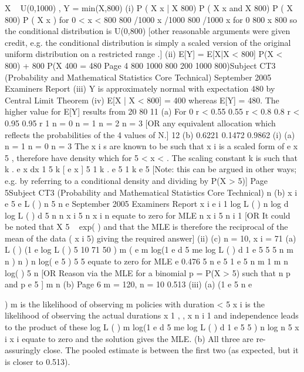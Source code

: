 \documentclass[a4paper,12pt]{article}
\begin{document}
X ~ U(0,1000) , Y = min(X,800)
(i)
P ( X
x | X
800)
P ( X
x and X 800)
P ( X 800)
P ( X x )
for 0 < x < 800
800 /1000
x /1000
800 /1000
x
for 0
800
x 800
so the conditional distribution is U(0,800)
[other reasonable arguments were given credit, e.g. the conditional
distribution is simply a scaled version of the original uniform distribution on a
restricted range .]
(ii)
E[Y] = E[X|X < 800] P(X < 800) + 800 P(X
400
= 480
Page 4
800
1000
800
200
1000
800)Subject CT3 (Probability and Mathematical Statistics Core Technical)
September 2005
Examiners Report
(iii) Y is approximately normal with expectation 480 by Central Limit Theorem
(iv) E[X | X < 800] = 400 whereas E[Y] = 480.
The higher value for E[Y] results from 20%
80%
11
(a)
For 0 r < 0.55
0.55 r < 0.8
0.8 r < 0.95
0.95 r 1
n = 0
n = 1
n = 2
n = 3
[OR any equivalent allocation which reflects the probabilities of the 4 values
of N.]
12
(b) 0.6221
0.1472
0.9862
(i) (a)
n = 1
n = 0
n = 3
The x i s are known to be such that x i
is a scaled form of e
x
5 , therefore have density which
for 5 < x < .
The scaling constant k is such that
k . e
x
dx 1
5
k [ e
x
] 5
1
k . e
5
1
k
e 5
[Note: this can be argued in other ways; e.g. by referring to a
conditional density and dividing by P(X > 5)]
Page 5Subject CT3 (Probability and Mathematical Statistics Core Technical)
n
(b)
x i
e 5 e
L ( )
n 5 n
e
September 2005
Examiners Report
x i
e
i 1
log L ( )
n log
d
log L ( )
d
5 n
n
x i
5 n
x i
n
equate to zero for MLE
n
x i 5 n
i 1
[OR It could be noted that X 5 ~ exp( ) and that the MLE is
therefore the reciprocal of the mean of the data ( x i 5) giving the
required answer]
(ii)
(c) n = 10, x i = 71
(a) L ( ) (1 e
log L ( )
5
10
71 50
) m ( e
m log(1 e
d
5 me
log L ( )
d
1 e
5
5
5
n
m n
) n
) n log( e
5
)
5
5
equate to zero for MLE
e
0.476
5 n
e
5
1 e
5
n
m
1
m n
log(
)
5
n
[OR Reason via the MLE for a binomial p = P(X > 5) such that
n
p
and p e 5 ]
m n
(b)
Page 6
m = 120, n = 10
0.513
(iii)
(a)
(1 e
5
n
e

) m is the likelihood of observing m policies with duration < 5
x i
is the likelihood of observing the actual durations x 1 ,
, x n
i 1
and independence leads to the product of these
log L ( )
m log(1 e
d
5 me
log L ( )
d
1 e
5
5
) n log
n
5
x i
x i
equate to zero and the solution gives the MLE.
(b)
All three are re-assuringly close.
The pooled estimate is between the first two (as expected, but it is
closer to 0.513).
\end{document}
